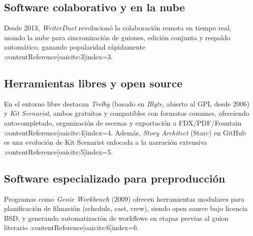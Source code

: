 \documentclass[12pt]{article}
\begin{document}
	\subsection{Software colaborativo y en la nube}
	Desde 2013, \textit{WriterDuet} revolucionó la colaboración remota en tiempo real, usando la nube para sincronización de guiones, edición conjunta y respaldo automático, ganando popularidad rápidamente :contentReference[oaicite:3]{index=3}.

	\subsection{Herramientas libres y open source}
	En el entorno libre destacan \textit{Trelby} (basado en \textit{Blyte}, abierto al GPL desde 2006) y \textit{Kit Scenarist}, ambos gratuitos y compatibles con formatos comunes, ofreciendo autocompletado, organización de escenas y exportación a FDX/PDF/Fountain :contentReference[oaicite:4]{index=4}. Además, \textit{Story Architect} (Starc) en GitHub es una evolución de Kit Scenarist enfocada a la narración extensiva :contentReference[oaicite:5]{index=5}.

	\subsection{Software especializado para preproducción}
	Programas como \textit{Genie Workbench} (2009) ofrecen herramientas modulares para planificación de filmación (schedule, cast, crew), siendo open source bajo licencia BSD, y generando automatización de workflows en etapas previas al guion literario :contentReference[oaicite:6]{index=6}.

	\printbibliography
\end{document}
